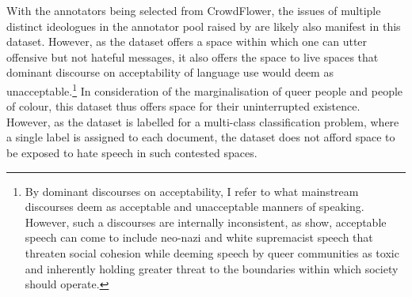 With the annotators being selected from CrowdFlower, the issues of multiple distinct ideologues in the annotator pool raised by \citet{Waseem:2016} are likely also manifest in this dataset.
However, as the dataset offers a space within which one can utter offensive but not hateful messages, it also offers the space to live spaces that dominant discourse on acceptability of language use would deem as unacceptable.\footnote{By dominant discourses on acceptability, I refer to what mainstream discourses deem as acceptable and unacceptable manners of speaking. However, such a discourses are internally inconsistent, as \citet{Oliva:2020} show, acceptable speech can come to include neo-nazi and white supremacist speech that threaten social cohesion while deeming speech by queer communities as toxic and inherently holding greater threat to the boundaries within which society should operate.}
In consideration of the marginalisation of queer people and people of colour, this dataset thus offers space for their uninterrupted existence. However, as the dataset is labelled for a multi-class classification problem, where a single label is assigned to each document, the dataset does not afford space to be exposed to hate speech in such contested spaces.

